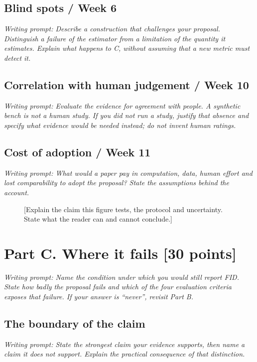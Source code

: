 \documentclass[11pt,a4paper]{article}
\newcommand{\prompt}[1]{{\small\color{PromptGrey}\textit{Writing prompt: #1}\par}}
\begin{document}
\subsection{Blind spots / Week 6}
\prompt{Describe a construction that challenges your proposal. Distinguish a
failure of the estimator from a limitation of the quantity it estimates.
Explain what happens to C, without assuming that a new metric must detect it.}

\subsection{Correlation with human judgement / Week 10}
\prompt{Evaluate the evidence for agreement with people. A synthetic bench is
not a human study. If you did not run a study, justify that absence and specify
what evidence would be needed instead; do not invent human ratings.}

\subsection{Cost of adoption / Week 11}
\prompt{What would a paper pay in computation, data, human effort and lost
comparability to adopt the proposal? State the assumptions behind the account.}

\begin{figure}[htbp]
  \centering
  \caption{[Explain the claim this figure tests, the protocol and uncertainty.
  State what the reader can and cannot conclude.]}
  \label{fig:evidence}
\end{figure}

\section{Part C. Where it fails [30 points]}
\prompt{Name the condition under which you would still report FID. State how
badly the proposal fails and which of the four evaluation criteria exposes
that failure. If your answer is ``never'', revisit Part B.}

\subsection{The boundary of the claim}
\prompt{State the strongest claim your evidence supports, then name a claim it
does not support. Explain the practical consequence of that distinction.}
\end{document}
